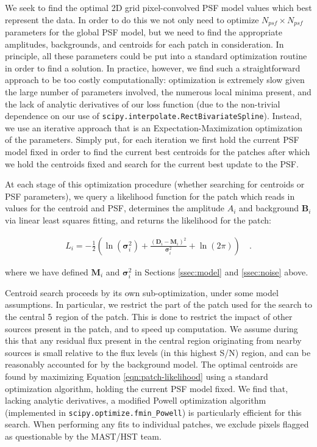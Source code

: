 \documentclass[12pt,letterpaper,preprint]{aastex}
\newcommand{\vect}[1]{\mathbf{#1}}
\newcommand{\data}{\vect{D}}
\newcommand{\model}{\vect{M}}
\newcommand{\bkg}{\vect{B}}
\newcommand{\var}{\vect{\sigma}^2}
\begin{document}
We seek to find the optimal 2D grid pixel-convolved PSF model values which best represent the 
data.  In order to do this we not only need to optimize $N_{psf} \times N_{psf}$ parameters for the 
global PSF model, but we need to find the appropriate amplitudes, backgrounds, and centroids 
for each patch in consideration.  In principle, all these parameters could be put into a standard 
optimization routine in order to find a solution.  In practice, however, we find such a straightforward 
approach to be too costly computationally: optimization is extremely slow given the large number 
of parameters involved, the numerous local minima present, and the lack of analytic derivatives of 
our loss function (due to the non-trivial dependence on our use of 
\texttt{scipy.interpolate.RectBivariateSpline}).  Instead, we use an iterative approach that is an 
Expectation-Maximization optimization of the parameters.  Simply put, for each iteration we first 
hold the current PSF model fixed in order to find the current best centroids for the patches after 
which we hold the centroids fixed and search for the current best update to the PSF.  

At each stage of this optimization procedure (whether searching for centroids or PSF parameters),
we query a likelihood function for the patch which reads in values for the centroid and PSF,
determines the amplitude $A_i$ and background $\bkg_i$ via linear least squares fitting, and 
returns the likelihood for the patch:

\begin{eqnarray}
L_i =  -\frac{1}{2}\left(\ln(\var_i) +  \frac{(\data_i - \model_i)^2}{\var_i} + \ln(2\pi)\right)
\quad .
\label{eqn:patch-likelihood}
\end{eqnarray}

\noindent where we have defined $\model_i$ and $\var_i$ in Sections \ref{ssec:model} and 
\ref{ssec:noise} above.  

Centroid search proceeds by its own sub-optimization, under some model assumptions.  
In particular, we restrict the part of the patch used for the search to the central $5\time5$ region 
of the patch.  This is done to restrict the impact of other sources present in the patch, and 
to speed up computation.  We assume during this that any residual flux present in the central 
region originating from nearby sources is small relative to the flux levels (in this highest S/N) 
region, and can be reasonably accounted for by the background model.  The optimal 
centroids are found by maximizing Equation \ref{eqn:patch-likelihood} using a standard
optimization algorithm, holding the current PSF model fixed.  We find that, lacking analytic 
derivatives, a modified Powell optimization algorithm 
(implemented in \texttt{scipy.optimize.fmin\_Powell}) is particularly efficient for this search.  
When performing any fits to individual patches, we exclude pixels flagged as questionable 
by the MAST/HST team.
\end{document}

